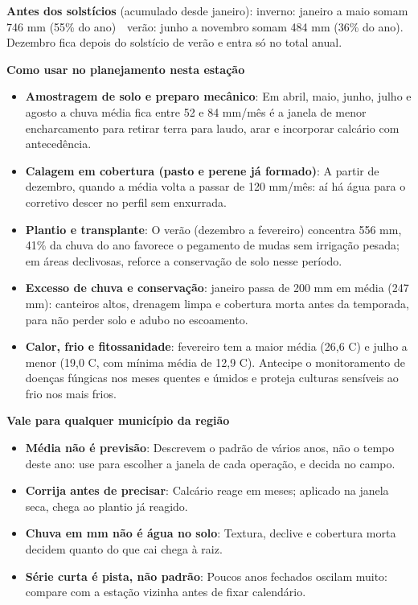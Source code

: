 \documentclass[10pt,a4paper]{article}
\begin{document}
\vspace{1pt}
{\footnotesize\textbf{Antes dos solstícios} (acumulado desde janeiro):
inverno: janeiro a maio somam 746 mm (55\% do ano) \,\textbullet\, verão: junho a novembro somam 484 mm (36\% do ano). Dezembro fica depois do solstício de verão e entra só no total
anual.}

\vspace{2pt}
{\bfseries\small Como usar no planejamento nesta estação}

\footnotesize\begin{itemize}\setlength{\itemsep}{0.5pt}
  \item \textbf{Amostragem de solo e preparo mecânico}: Em abril, maio, junho, julho e agosto a chuva média fica entre 52 e 84 mm/mês \textemdash{} é a janela de menor encharcamento para retirar terra para laudo, arar e incorporar calcário com antecedência.
  \item \textbf{Calagem em cobertura (pasto e perene já formado)}: A partir de dezembro, quando a média volta a passar de 120 mm/mês: aí há água para o corretivo descer no perfil sem enxurrada.
  \item \textbf{Plantio e transplante}: O verão (dezembro a fevereiro) concentra 556 mm, 41\% da chuva do ano \textemdash{} favorece o pegamento de mudas sem irrigação pesada; em áreas declivosas, reforce a conservação de solo nesse período.
  \item \textbf{Excesso de chuva e conservação}: janeiro passa de 200 mm em média (247 mm): canteiros altos, drenagem limpa e cobertura morta antes da temporada, para não perder solo e adubo no escoamento.
  \item \textbf{Calor, frio e fitossanidade}: fevereiro tem a maior média (26,6 \textdegree{}C) e julho a menor (19,0 \textdegree{}C, com mínima média de 12,9 \textdegree{}C). Antecipe o monitoramento de doenças fúngicas nos meses quentes e úmidos e proteja culturas sensíveis ao frio nos mais frios.
\end{itemize}

\vspace{1pt}
{\bfseries\small Vale para qualquer município da região}

\scriptsize\begin{itemize}\setlength{\itemsep}{0.5pt}
  \item \textbf{Média não é previsão}: Descrevem o padrão de vários anos, não o tempo deste ano: use para escolher a janela de cada operação, e decida no campo.
  \item \textbf{Corrija antes de precisar}: Calcário reage em meses; aplicado na janela seca, chega ao plantio já reagido.
  \item \textbf{Chuva em mm não é água no solo}: Textura, declive e cobertura morta decidem quanto do que cai chega à raiz.
  \item \textbf{Série curta é pista, não padrão}: Poucos anos fechados oscilam muito: compare com a estação vizinha antes de fixar calendário.
\end{itemize}
\end{document}
